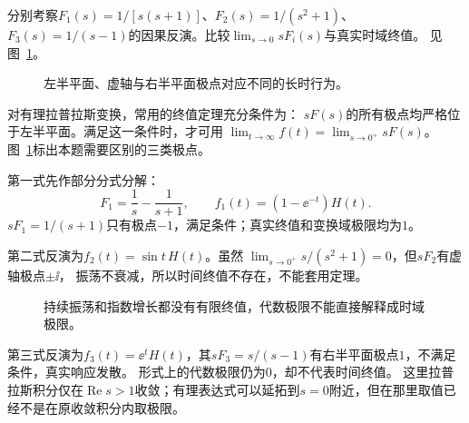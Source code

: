 \begin{exercise}[终值定理的适用范围]\label{ex:c4-h15}
分别考察$F_1(s)=1/[s(s+1)]$、$F_2(s)=1/(s^2+1)$、$F_3(s)=1/(s-1)$的因果反演。比较$\lim_{s\to0}sF_i(s)$与真实时域终值。 见图~\ref{fig:c4-h15-q}。
\end{exercise}

\begin{figure}[H]\centering
{}
\caption{左半平面、虚轴与右半平面极点对应不同的长时行为。}\label{fig:c4-h15-q}
\end{figure}
\begin{solution}
对有理拉普拉斯变换，常用的终值定理充分条件为：
$sF(s)$的所有极点均严格位于左半平面。满足这一条件时，才可用
$\lim_{t\to\infty}f(t)=\lim_{s\to0^+}sF(s)$。
图~\ref{fig:c4-h15-q}标出本题需要区别的三类极点。

第一式先作部分分式分解：
\[
 F_1=\frac1s-\frac1{s+1},\qquad
 f_1(t)=(1-\ee^{-t})H(t).
\]
$sF_1=1/(s+1)$只有极点$-1$，满足条件；真实终值和变换域极限均为$1$。

第二式反演为$f_2(t)=\sin t\,H(t)$。虽然
$\lim_{s\to0^+}s/(s^2+1)=0$，但$sF_2$有虚轴极点$\pm\ii$，
振荡不衰减，所以时间终值不存在，不能套用定理。
\begin{figure}[H]\centering
{}
\caption{持续振荡和指数增长都没有有限终值，代数极限不能直接解释成时域极限。}\label{fig:c4-h15-s}
\end{figure}
第三式反演为$f_3(t)=\ee^tH(t)$，其$sF_3=s/(s-1)$有右半平面极点$1$，不满足条件，真实响应发散。
形式上的代数极限仍为$0$，却不代表时间终值。
这里拉普拉斯积分仅在$\operatorname{Re}s>1$收敛；有理表达式可以延拓到$s=0$附近，但在那里取值已经不是在原收敛积分内取极限。

\end{solution}

